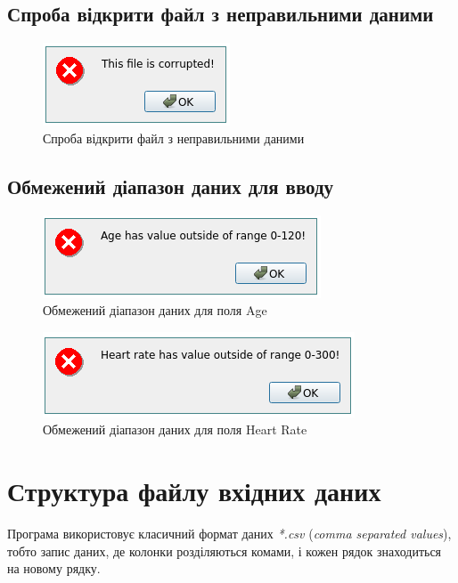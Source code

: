 \documentclass[oneside,14pt]{extarticle}
\begin{document}
\subsection{Спроба відкрити файл з неправильними даними}
\begin{figure}[H]
	\centering
	\includegraphics[scale=1]{21}
	\caption{Спроба відкрити файл з неправильними даними}
\end{figure}

\subsection{Обмежений діапазон даних для вводу}
\begin{figure}[H]
	\centering
	\includegraphics[scale=1]{20}
	\caption{Обмежений діапазон даних для поля Age}
\end{figure}

\begin{figure}[H]
	\centering
	\includegraphics[scale=1]{22}
	\caption{Обмежений діапазон даних для поля Heart Rate}
\end{figure}

\section{Структура файлу вхідних даних}
Програма використовує класичний формат даних \textit{*.csv} (\textit{comma separated values}), тобто запис даних, де колонки розділяються комами, і кожен рядок знаходиться на новому рядку. 
\end{document}
